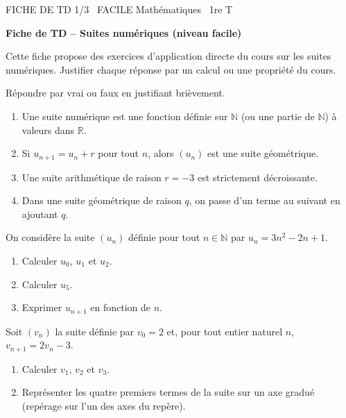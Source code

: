 \documentclass[11pt]{article}
\begin{document}
\begin{tcolorbox}[enhanced,colback=popink,colframe=popink,arc=10pt,boxrule=0pt,left=12pt,right=12pt,top=9pt,bottom=9pt]
{\color{white}\popxbold\small FICHE DE TD 1/3 \textbullet\ FACILE \hfill Mathématiques \textbullet\ 1re T\par}
\end{tcolorbox}
\vspace{4pt}
\textbf{Fiche de TD -- Suites numériques (niveau facile)}

Cette fiche propose des exercices d'application directe du cours sur les suites numériques. Justifier chaque réponse par un calcul ou une propriété du cours.

\begin{exercice}
Répondre par vrai ou faux en justifiant brièvement.
\begin{enumerate}
\item Une suite numérique est une fonction définie sur $\mathbb{N}$ (ou une partie de $\mathbb{N}$) à valeurs dans $\mathbb{R}$.
\item Si $u_{n+1} = u_n + r$ pour tout $n$, alors $(u_n)$ est une suite géométrique.
\item Une suite arithmétique de raison $r = -3$ est strictement décroissante.
\item Dans une suite géométrique de raison $q$, on passe d'un terme au suivant en ajoutant $q$.
\end{enumerate}
\end{exercice}

\begin{exercice}
On considère la suite $(u_n)$ définie pour tout $n \in \mathbb{N}$ par $u_n = 3n^2 - 2n + 1$.
\begin{enumerate}
\item Calculer $u_0$, $u_1$ et $u_2$.
\item Calculer $u_5$.
\item Exprimer $u_{n+1}$ en fonction de $n$.
\end{enumerate}
\end{exercice}

\begin{exercice}
Soit $(v_n)$ la suite définie par $v_0 = 2$ et, pour tout entier naturel $n$, $v_{n+1} = 2v_n - 3$.
\begin{enumerate}
\item Calculer $v_1$, $v_2$ et $v_3$.
\item Représenter les quatre premiers termes de la suite sur un axe gradué (repérage sur l'un des axes du repère).
\end{enumerate}
\end{exercice}
\end{document}
